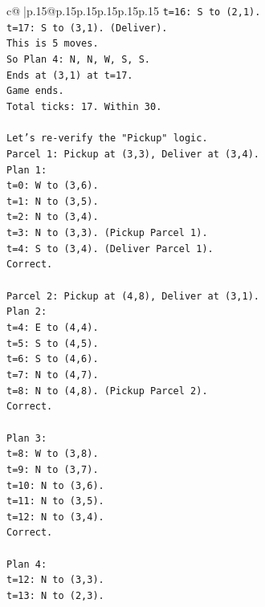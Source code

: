 \documentclass{article}
\begin{document}
{\begin{supertabular}{c@{$\;$}|p{.15\linewidth}@{}p{.15\linewidth}p{.15\linewidth}p{.15\linewidth}p{.15\linewidth}p{.15\linewidth}}
{{{\texttt{t=16: S to (2,1).} \\
\texttt{t=17: S to (3,1). (Deliver).} \\
\texttt{This is 5 moves.} \\
\texttt{So Plan 4: N, N, W, S, S.} \\
\texttt{Ends at (3,1) at t=17.} \\
\texttt{Game ends.} \\
\texttt{Total ticks: 17. Within 30.} \\
\\ 
\texttt{Let's re{-}verify the "Pickup" logic.} \\
\texttt{Parcel 1: Pickup at (3,3), Deliver at (3,4).} \\
\texttt{Plan 1:} \\
\texttt{t=0: W to (3,6).} \\
\texttt{t=1: N to (3,5).} \\
\texttt{t=2: N to (3,4).} \\
\texttt{t=3: N to (3,3). (Pickup Parcel 1).} \\
\texttt{t=4: S to (3,4). (Deliver Parcel 1).} \\
\texttt{Correct.} \\
\\ 
\texttt{Parcel 2: Pickup at (4,8), Deliver at (3,1).} \\
\texttt{Plan 2:} \\
\texttt{t=4: E to (4,4).} \\
\texttt{t=5: S to (4,5).} \\
\texttt{t=6: S to (4,6).} \\
\texttt{t=7: N to (4,7).} \\
\texttt{t=8: N to (4,8). (Pickup Parcel 2).} \\
\texttt{Correct.} \\
\\ 
\texttt{Plan 3:} \\
\texttt{t=8: W to (3,8).} \\
\texttt{t=9: N to (3,7).} \\
\texttt{t=10: N to (3,6).} \\
\texttt{t=11: N to (3,5).} \\
\texttt{t=12: N to (3,4).} \\
\texttt{Correct.} \\
\\ 
\texttt{Plan 4:} \\
\texttt{t=12: N to (3,3).} \\
\texttt{t=13: N to (2,3).} \\
}}}
\end{supertabular}}
\end{document}
